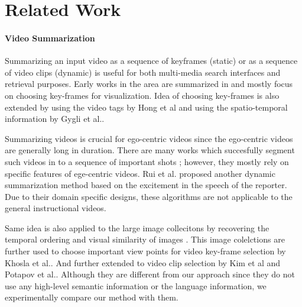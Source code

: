 \section{Related Work}
\paragraph{Video Summarization}
Summarizing an input video as a sequence of keyframes (static) or as a sequence of video clips (dynamic) is useful for both multi-media search interfaces and retrieval purposes. Early works in the area are summarized in \cite{vidAbstraction} and mostly focus on choosing key-frames for visualization. Idea of choosing key-frames is also extended by using the video tags by Hong et al\cite{beyondSearch} and using the spatio-temporal information by Gygli et al.\cite{createSum}.

Summarizing videos is crucial for ego-centric videos since the ego-centric videos are generally long in duration. There are many works which succesfully segment such videos in to a sequence of important shots \cite{lee2012discovering, lu2013story}; however, they mostly rely on specific features of ege-centric videos. Rui et al. \cite{rui2000automatically} proposed another dynamic summarization method based on the excitement in the speech of the reporter. Due to their domain specific designs, these algorithms are not applicable to the general instructional videos.

Same idea is also applied to the large image collecitons by recovering the temporal ordering and visual similarity of images \cite{storyGraph}. This image colelctions are further used to choose important view points for video key-frame selection by Khosla et al.\cite{khosla2013large}. And further extended to video clip selection by Kim et al\cite{kim2014joint} and Potapov et al.\cite{potapov2014category}. Although they are different from our approach since they do not use any high-level semantic information or the language information, we experimentally compare our method with them.


